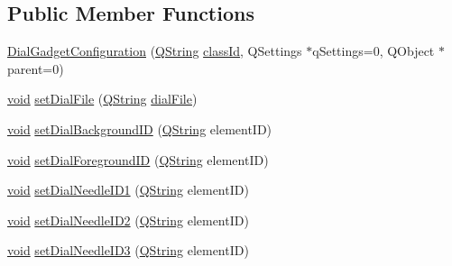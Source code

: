\subsection*{\-Public \-Member \-Functions}
\begin{DoxyCompactItemize}
\item 
\hyperlink{group___dial_plugin_ga5818a8a26f5b9e63b9bc37f459ca6594}{\-Dial\-Gadget\-Configuration} (\hyperlink{group___u_a_v_objects_plugin_gab9d252f49c333c94a72f97ce3105a32d}{\-Q\-String} \hyperlink{group___core_plugin_gac953657221ba7fda967ada0408332641}{class\-Id}, \-Q\-Settings $\ast$q\-Settings=0, \-Q\-Object $\ast$parent=0)
\item 
\hyperlink{group___u_a_v_objects_plugin_ga444cf2ff3f0ecbe028adce838d373f5c}{void} \hyperlink{group___dial_plugin_ga7172a5e20f324dd2e11a31167ee87a9a}{set\-Dial\-File} (\hyperlink{group___u_a_v_objects_plugin_gab9d252f49c333c94a72f97ce3105a32d}{\-Q\-String} \hyperlink{group___dial_plugin_ga620e44289c1d546a4fdd1c604d889eaa}{dial\-File})
\item 
\hyperlink{group___u_a_v_objects_plugin_ga444cf2ff3f0ecbe028adce838d373f5c}{void} \hyperlink{group___dial_plugin_gaed251d96de4cea86a69a9b52529c5c69}{set\-Dial\-Background\-I\-D} (\hyperlink{group___u_a_v_objects_plugin_gab9d252f49c333c94a72f97ce3105a32d}{\-Q\-String} element\-I\-D)
\item 
\hyperlink{group___u_a_v_objects_plugin_ga444cf2ff3f0ecbe028adce838d373f5c}{void} \hyperlink{group___dial_plugin_gae2dfdc5ebf459904a68d37b1401bf723}{set\-Dial\-Foreground\-I\-D} (\hyperlink{group___u_a_v_objects_plugin_gab9d252f49c333c94a72f97ce3105a32d}{\-Q\-String} element\-I\-D)
\item 
\hyperlink{group___u_a_v_objects_plugin_ga444cf2ff3f0ecbe028adce838d373f5c}{void} \hyperlink{group___dial_plugin_ga348ba33a6676d7777a8fb313029f71a0}{set\-Dial\-Needle\-I\-D1} (\hyperlink{group___u_a_v_objects_plugin_gab9d252f49c333c94a72f97ce3105a32d}{\-Q\-String} element\-I\-D)
\item 
\hyperlink{group___u_a_v_objects_plugin_ga444cf2ff3f0ecbe028adce838d373f5c}{void} \hyperlink{group___dial_plugin_ga10bf865d3762437b52c122ca25827bf1}{set\-Dial\-Needle\-I\-D2} (\hyperlink{group___u_a_v_objects_plugin_gab9d252f49c333c94a72f97ce3105a32d}{\-Q\-String} element\-I\-D)
\item 
\hyperlink{group___u_a_v_objects_plugin_ga444cf2ff3f0ecbe028adce838d373f5c}{void} \hyperlink{group___dial_plugin_gaa9309c52e9b730a340f1c28ec1dc8a51}{set\-Dial\-Needle\-I\-D3} (\hyperlink{group___u_a_v_objects_plugin_gab9d252f49c333c94a72f97ce3105a32d}{\-Q\-String} element\-I\-D)

\end{DoxyCompactItemize}
